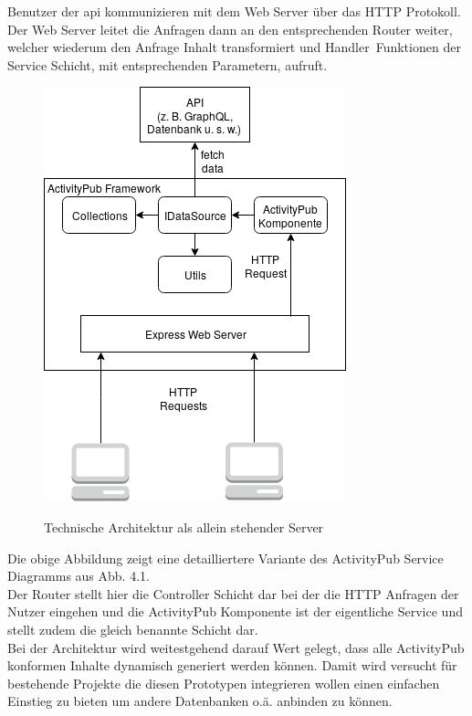 	Benutzer der \gls{api} kommunizieren mit dem Web Server über das HTTP Protokoll. Der Web Server leitet die Anfragen dann an den entsprechenden Router weiter, welcher wiederum den Anfrage Inhalt transformiert und \glqq Handler\grqq~Funktionen der Service Schicht, mit entsprechenden Parametern, aufruft.
	\begin{figure}[h]
		\begin{minipage}{\textwidth}
			\centering
			\includegraphics[scale=0.6]{figures/technical-architecture-standalone.png}
			\label{technische-architektur-standalone}
			\caption{Technische Architektur als allein stehender Server}
		\end{minipage}
	\end{figure}
	Die obige Abbildung zeigt eine detailliertere Variante des ActivityPub Service Diagramms aus Abb. 4.1.\\
	
	Der Router stellt hier die Controller Schicht dar bei der die HTTP Anfragen der Nutzer eingehen und die ActivityPub Komponente ist der eigentliche Service und stellt zudem die gleich benannte Schicht dar.\\
	
	Bei der Architektur wird weitestgehend darauf Wert gelegt, dass alle ActivityPub konformen Inhalte dynamisch generiert werden können. Damit wird versucht für bestehende Projekte die diesen Prototypen integrieren wollen einen einfachen Einstieg zu bieten um andere Datenbanken o.ä. anbinden zu können.\\